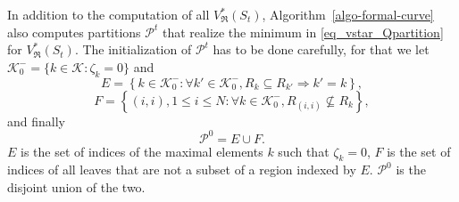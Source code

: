 \documentclass[
  11pt,
  a4paper,
]{article}
\theoremstyle{plain}
\theoremstyle{plain}
\theoremstyle{definition}
\theoremstyle{plain}
\theoremstyle{definition}
\theoremstyle{remark}
\begin{document}
In addition to the computation of all \(V^*_{\mathfrak{R}}(S_t)\),
Algorithm~\ref{algo-formal-curve} also computes partitions
\(\mathcal{P}^t\) that realize the minimum in
\eqref{eq_vstar_Qpartition} for \(V^*_{\mathfrak{R}}(S_t)\). The
initialization of \(\mathcal{P}^t\) has to be done carefully, for that
we let \(\mathcal{K}_0^-=\{k\in\mathcal{K}: \zeta_k=0  \}\) and
\begin{equation}
E=\left\{k\in\mathcal{K}_0^-:\forall k'\in \mathcal{K}_0^-, R_k\subseteq R_{k'}\Rightarrow k'=k \right\},
\label{E}
\end{equation} \begin{equation}
F=\left\{(i,i), 1\leq i\leq N:\forall k\in \mathcal{K}_0^-, R_{(i,i)}\not\subseteq R_k  \right\},
\label{F}
\end{equation} and finally \begin{equation}
\mathcal{P}^0=E\cup F.
\label{cP0}
\end{equation} \(E\) is the set of indices of the maximal elements \(k\)
such that \(\zeta_k=0\), \(F\) is the set of indices of all leaves that
are not a subset of a region indexed by \(E\). \(\mathcal{P}^0\) is the
disjoint union of the two.
\end{document}
